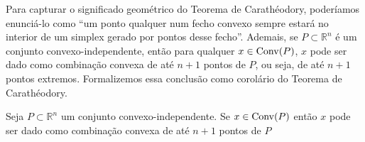 Para capturar o significado geométrico do Teorema de Carathéodory, poderíamos
enunciá-lo como ``um ponto qualquer num fecho convexo sempre estará no interior
de um simplex gerado por pontos desse fecho''. Ademais, se $P \subset \mathbb{R}^n$ é um conjunto
convexo-independente, então para qualquer $x \in \mathrm{Conv}(P)$, $x$ pode ser dado
como combinação convexa de até $n + 1$ pontos de $P$, ou seja, de até $n + 1$ pontos extremos. 
Formalizemos essa conclusão como corolário do Teorema de Carathéodory.

\begin{cor:caratheodory}
	Seja $P \subset \mathbb{R}^n$ um conjunto convexo-independente. Se $x \in \mathrm{Conv}(P)$
	então $x$ pode ser dado como combinação convexa de até $n + 1$ pontos de $P$	
\end{cor:caratheodory}

